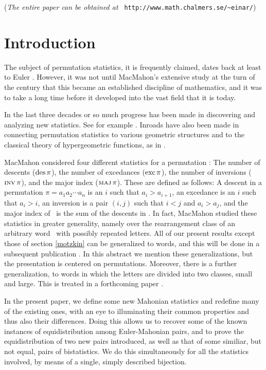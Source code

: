 \medskip
\noindent
({\em The entire paper can be obtained at}\/ {\tt
http://www.math.chalmers.se/\~{}einar/})

%


\section{Introduction}
The subject of permutation statistics, it is frequently claimed, dates
back at least to Euler \cite{euler}.  However, it was not until
MacMahon's extensive study \cite{macmahon} at the turn of the century
that this became an established discipline of mathematics, and it was
to take a long time before it developed into the vast field that it is
today.


In the last three decades or so much progress has been made in
discovering and analyzing new statistics.  See for example \cite{foa1,
  foa2, FS1, FS2, FZ, galwhite, ra, simstan1, stanley}.  Inroads have
also been made in connecting permutation statistics to various
geometric structures and to the classical theory of hypergeometric
functions, as in \cite{fla, fravie, garges, medvie, simstan1}.

MacMahon considered four different statistics for a permutation \p:
The number of descents ($\mathop{\rm des} \mbox{$\pi$}$), the number of excedances ($\mathop{\rm exc}
\mbox{$\pi$}$), the number of inversions ($\mathop{\mbox{\sc inv}}\nolimits \mbox{$\pi$}$), and the major index ($\mathop{\mbox{\sc maj}}\nolimits
\mbox{$\pi$}$).  These are defined as follows: A descent in a permutation $\pi =
a_1 a_2\cdots a_n$ is an $i$ such that $a_i>a_{i+1}$, an excedance is
an $i$ such that $a_i>i$, an inversion is a pair $(i,j)$ such that
$i<j$ and $a_i>a_j$, and the major index of \p\ is the sum of the
descents in \p. In fact, MacMahon studied these statistics in greater
generality, namely over the rearrangement class of an arbitrary word
\w\ with possibly repeated letters.  All of our present results except
those of section \ref{motzkin} can be generalized to words, and this
will be done in a subsequent publication \cite{CSZ}.  In this abstract
we mention these generalizations, but the presentation is centered on
permutations.  Moreover, there is a further generalization, to words
in which the letters are divided into two classes, small and large.
This is treated in a forthcoming paper \cite{kmad}.



In the present paper, we define some new Mahonian statistics and
redefine many of the existing ones, with an eye to illuminating their
common properties and thus also their differences.  Doing this allows
us to recover some of the known instances of equidistribution among
Euler-Mahonian pairs, and to prove the equidistribution of two new
pairs introduced, as well as that of some similiar, but not equal,
pairs of bistatistics.  We do this simultaneously for all the
statistics involved, by means of a single, simply described bijection.

